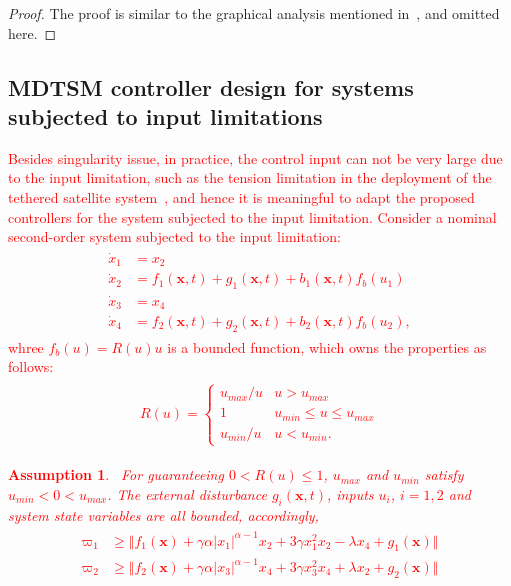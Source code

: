 \documentclass[3p]{elsarticle}
\theoremstyle{plain}
\newtheorem{myas}{Assumption}
\theoremstyle{remark}
\begin{document}
\begin{proof}
The proof is similar to the graphical analysis mentioned in~\cite{feng2013nonsingular}, and omitted here.
\end{proof}
\subsection{MDTSM controller design for systems subjected to input limitations}
\textcolor{red}{
Besides singularity issue, in practice, the control input can not be very large due to the input limitation, such as the tension limitation in the deployment of the tethered satellite system~\cite{Ma201667}, and hence it is meaningful to adapt the proposed controllers for the system subjected to the input limitation. Consider a nominal second-order system subjected to the input limitation:
\begin{align}
\begin{split}
\dot x_1 &= x_2\\
\dot x_2 &= f_1(\bm x,t)+g_1(\bm x,t)+b_1(\bm x,t)f_b(u_1)\\
\dot x_3 &= x_4\\
\dot x_4 &= f_2(\bm x,t)+g_2(\bm x,t)+b_2(\bm x,t)f_b(u_2),\label{eq:second-order system subjected to limitation}
\end{split}
\end{align}
whree $f_b(u) = R(u)u$ is a bounded function, which owns the properties as follows:
\begin{align}\begin{split}
  R(u)=\begin{cases}
  u_{max}/u &u>u_{max}\\
  1&u_{min}\le u\le u_{max}\\
  u_{min}/u& u<u_{min}.
\end{cases}\end{split}
\end{align}
\begin{myas}~\cite{Ma201667}\label{myas:1}
For guaranteeing $0<R(u)\le 1$, $u_{max}$ and $u_{min}$ satisfy $u_{min}<0<u_{max}$. The external disturbance $g_i(\bm x,t)$, inputs $u_i$, $i=1,2$ and system state variables are all bounded, accordingly,
\begin{align}\begin{split}
  \varpi_1 &\ge \Vert f_1(\bm x)+\gamma\alpha\vert x_1\vert^{\alpha-1}x_2+3\gamma x_1^2x_2-\lambda x_4+g_1(\bm x)\Vert\\
  \varpi_2 &\ge \Vert f_2(\bm x)+\gamma\alpha\vert x_3\vert^{\alpha-1}x_4+3\gamma x_3^2x_4+\lambda x_2+g_2(\bm x)\Vert\\

\end{split}
\end{align}
\end{myas}}
\end{document}
